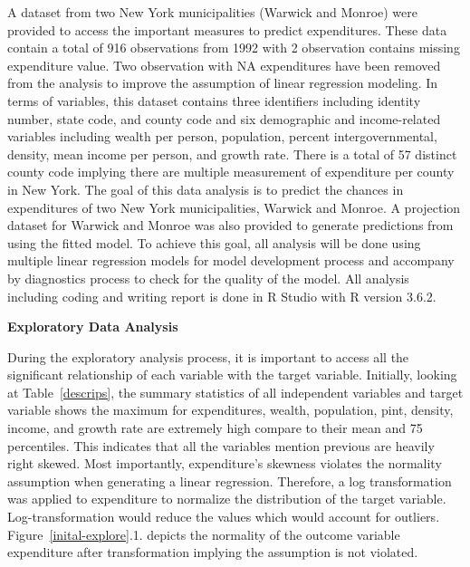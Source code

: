 \documentclass[11pt]{article}\usepackage[]{graphicx}\usepackage[]{color}
\begin{document}
\noindent A dataset from two New York municipalities (Warwick and Monroe) were provided to access the important measures to predict expenditures. These data contain a total of 916 observations from 1992 with 2 observation contains missing expenditure value. Two observation with NA expenditures have been removed from the analysis to improve the assumption of linear regression modeling. In terms of variables, this dataset contains three identifiers including identity number, state code, and county code and six demographic and income-related variables including wealth per person, population, percent intergovernmental, density, mean income per person, and growth rate. There is a total of 57 distinct county code implying there are multiple measurement of expenditure per county in New York. The goal of this data analysis is to predict the chances in expenditures of two New York municipalities, Warwick and Monroe. A projection dataset for Warwick and Monroe was also provided to generate predictions from using the fitted model. To achieve this goal, all analysis will be done using multiple linear regression models for model development process and accompany by diagnostics process to check for the quality of the model. All analysis including coding and writing report is done in R Studio with R version 3.6.2.    
\hfill \break

\noindent\textbf{Exploratory Data Analysis} 

\noindent During the exploratory analysis process, it is important to access all the significant relationship of each variable with the target variable. Initially, looking at Table~\ref{descrips}, the summary statistics of all independent variables and target variable shows the maximum for expenditures, wealth, population, pint, density, income, and growth rate are extremely high compare to their mean and 75 percentiles. This indicates that all the variables mention previous are heavily right skewed. Most importantly, expenditure's skewness violates the normality assumption when generating a linear regression. Therefore, a log transformation was applied to expenditure to normalize the distribution of the target variable. Log-transformation would reduce the values which would account for outliers. Figure~\ref{inital-explore}.1. depicts the normality of the outcome variable expenditure after transformation implying the assumption is not violated.
\end{document}
